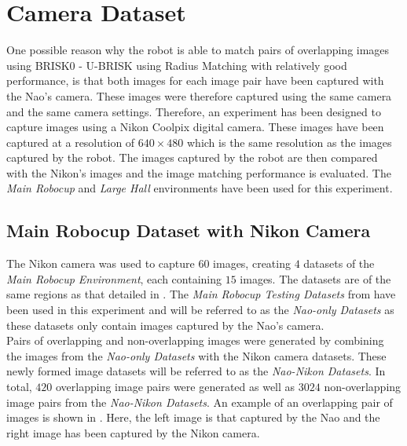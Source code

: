 \section{Camera Dataset}
\label{sec:cameraMatching}
One possible reason why the robot is able to match pairs of overlapping images using BRISK0 - U-BRISK using Radius Matching with relatively good performance, is that both images for each image pair have been captured with the Nao's camera. These images were therefore captured using the same camera and the same camera settings. Therefore, an experiment has been designed to capture images using a Nikon Coolpix digital camera. These images have been captured at a resolution of $640 \times 480$ which is the same resolution as the images captured by the robot. The images captured by the robot are then compared with the Nikon's images and the image matching performance is evaluated. The \textit{Main Robocup} and \textit{Large Hall} environments have been used for this experiment.\\

\subsection{Main Robocup Dataset with Nikon Camera}
\label{sec:nikonRobocup}

The Nikon camera was used to capture $60$ images, creating $4$ datasets of the \textit{Main Robocup Environment}, each containing $15$ images. The datasets are of the same regions as that detailed in . The \textit{Main Robocup Testing Datasets} from  have been used in this experiment and will be referred to as the \textit{Nao-only Datasets} as these datasets only contain images captured by the Nao's camera.\\

Pairs of overlapping and non-overlapping images were generated by combining the images from the \textit{Nao-only Datasets} with the Nikon camera datasets. These newly formed image datasets will be referred to as the \textit{Nao-Nikon Datasets}. In total, $420$ overlapping image pairs were generated as well as $3024$ non-overlapping image pairs from the \textit{Nao-Nikon Datasets}. An example of an overlapping pair of images is shown in . Here, the left image is that captured by the Nao and the right image has been captured by the Nikon camera.\\

